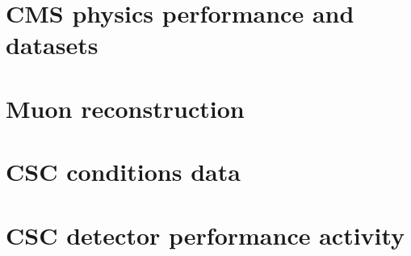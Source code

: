 \section{CMS physics performance and datasets} \label{sec:CMSPPD}


\section{Muon reconstruction} \label{sec:MuonReco}


\section{CSC conditions data} \label{sec:CSCConditionsData}


\section{CSC detector performance activity} \label{sec:CSCDPGActivity}
